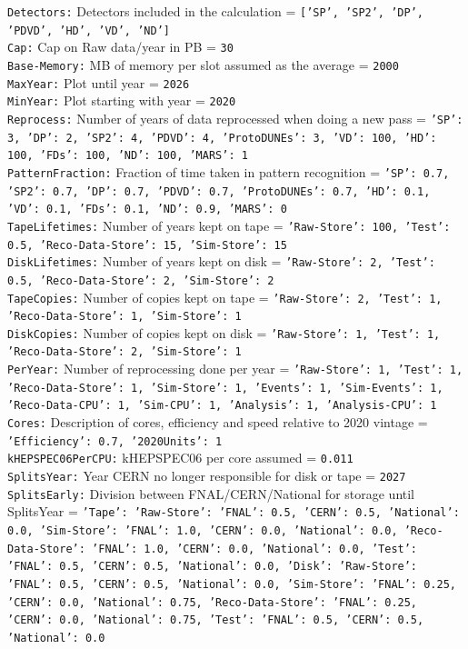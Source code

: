 {\tt Detectors:} Detectors included in the calculation = {\tt ['SP', 'SP2', 'DP', 'PDVD', 'HD', 'VD', 'ND']} \\
{\tt Cap:} Cap on Raw data/year in PB = {\tt 30} \\
{\tt Base-Memory:} MB of memory per slot assumed as the average = {\tt 2000} \\
{\tt MaxYear:} Plot until year = {\tt 2026} \\
{\tt MinYear:} Plot starting with year = {\tt 2020} \\
{\tt Reprocess:} Number of years of data reprocessed when doing a new pass = {\tt {'SP': 3, 'DP': 2, 'SP2': 4, 'PDVD': 4, 'ProtoDUNEs': 3, 'VD': 100, 'HD': 100, 'FDs': 100, 'ND': 100, 'MARS': 1}} \\
{\tt PatternFraction:} Fraction of time taken in pattern recognition = {\tt {'SP': 0.7, 'SP2': 0.7, 'DP': 0.7, 'PDVD': 0.7, 'ProtoDUNEs': 0.7, 'HD': 0.1, 'VD': 0.1, 'FDs': 0.1, 'ND': 0.9, 'MARS': 0}} \\
{\tt TapeLifetimes:} Number of years kept on tape = {\tt {'Raw-Store': 100, 'Test': 0.5, 'Reco-Data-Store': 15, 'Sim-Store': 15}} \\
{\tt DiskLifetimes:} Number of years kept on disk = {\tt {'Raw-Store': 2, 'Test': 0.5, 'Reco-Data-Store': 2, 'Sim-Store': 2}} \\
{\tt TapeCopies:} Number of copies kept on tape = {\tt {'Raw-Store': 2, 'Test': 1, 'Reco-Data-Store': 1, 'Sim-Store': 1}} \\
{\tt DiskCopies:} Number of copies kept on disk = {\tt {'Raw-Store': 1, 'Test': 1, 'Reco-Data-Store': 2, 'Sim-Store': 1}} \\
{\tt PerYear:} Number of reprocessing done per year = {\tt {'Raw-Store': 1, 'Test': 1, 'Reco-Data-Store': 1, 'Sim-Store': 1, 'Events': 1, 'Sim-Events': 1, 'Reco-Data-CPU': 1, 'Sim-CPU': 1, 'Analysis': 1, 'Analysis-CPU': 1}} \\
{\tt Cores:} Description of cores, efficiency and speed relative to 2020 vintage = {\tt {'Efficiency': 0.7, '2020Units': 1}} \\
{\tt kHEPSPEC06PerCPU:} kHEPSPEC06 per core assumed = {\tt 0.011} \\
{\tt SplitsYear:} Year CERN no longer responsible for disk or tape = {\tt 2027} \\
{\tt SplitsEarly:} Division between FNAL/CERN/National for storage until SplitsYear = {\tt {'Tape': {'Raw-Store': {'FNAL': 0.5, 'CERN': 0.5, 'National': 0.0}, 'Sim-Store': {'FNAL': 1.0, 'CERN': 0.0, 'National': 0.0}, 'Reco-Data-Store': {'FNAL': 1.0, 'CERN': 0.0, 'National': 0.0}, 'Test': {'FNAL': 0.5, 'CERN': 0.5, 'National': 0.0}}, 'Disk': {'Raw-Store': {'FNAL': 0.5, 'CERN': 0.5, 'National': 0.0}, 'Sim-Store': {'FNAL': 0.25, 'CERN': 0.0, 'National': 0.75}, 'Reco-Data-Store': {'FNAL': 0.25, 'CERN': 0.0, 'National': 0.75}, 'Test': {'FNAL': 0.5, 'CERN': 0.5, 'National': 0.0}}}} \\
